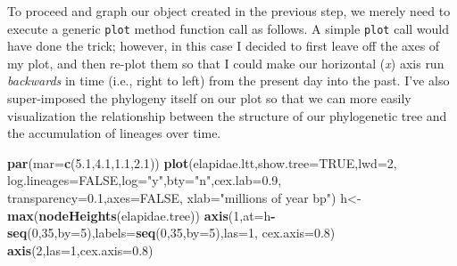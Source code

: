 \documentclass[fleqn,10pt,lineno]{wlpeerj} %
\newenvironment{Shaded}{\begin{snugshade}}{\end{snugshade}}
\newcommand{\AttributeTok}[1]{\textcolor[rgb]{0.13,0.29,0.53}{#1}}
\newcommand{\ConstantTok}[1]{\textcolor[rgb]{0.56,0.35,0.01}{#1}}
\newcommand{\DecValTok}[1]{\textcolor[rgb]{0.00,0.00,0.81}{#1}}
\newcommand{\FloatTok}[1]{\textcolor[rgb]{0.00,0.00,0.81}{#1}}
\newcommand{\FunctionTok}[1]{\textcolor[rgb]{0.13,0.29,0.53}{\textbf{#1}}}
\newcommand{\NormalTok}[1]{#1}
\newcommand{\OtherTok}[1]{\textcolor[rgb]{0.56,0.35,0.01}{#1}}
\newcommand{\SpecialCharTok}[1]{\textcolor[rgb]{0.81,0.36,0.00}{\textbf{#1}}}
\newcommand{\StringTok}[1]{\textcolor[rgb]{0.31,0.60,0.02}{#1}}
\begin{document}
To proceed and graph our object created in the previous step, we merely need to execute a generic \texttt{plot} method function call as follows. A simple \texttt{plot} call would have done the trick; however, in this case I decided to first leave off the axes of my plot, and then re-plot them so that I could make our horizontal (\emph{x}) axis run \emph{backwards} in time (i.e., right to left) from the present day into the past. I've also super-imposed the phylogeny itself on our plot so that we can more easily visualization the relationship between the structure of our phylogenetic tree and the accumulation of lineages over time.

\begin{Shaded}
\begin{Highlighting}[]
\FunctionTok{par}\NormalTok{(}\AttributeTok{mar=}\FunctionTok{c}\NormalTok{(}\FloatTok{5.1}\NormalTok{,}\FloatTok{4.1}\NormalTok{,}\FloatTok{1.1}\NormalTok{,}\FloatTok{2.1}\NormalTok{))}
\FunctionTok{plot}\NormalTok{(elapidae.ltt,}\AttributeTok{show.tree=}\ConstantTok{TRUE}\NormalTok{,}\AttributeTok{lwd=}\DecValTok{2}\NormalTok{,}
  \AttributeTok{log.lineages=}\ConstantTok{FALSE}\NormalTok{,}\AttributeTok{log=}\StringTok{"y"}\NormalTok{,}\AttributeTok{bty=}\StringTok{"n"}\NormalTok{,}\AttributeTok{cex.lab=}\FloatTok{0.9}\NormalTok{,}
  \AttributeTok{transparency=}\FloatTok{0.1}\NormalTok{,}\AttributeTok{axes=}\ConstantTok{FALSE}\NormalTok{,}
  \AttributeTok{xlab=}\StringTok{"millions of year bp"}\NormalTok{)}
\NormalTok{h}\OtherTok{\textless{}{-}}\FunctionTok{max}\NormalTok{(}\FunctionTok{nodeHeights}\NormalTok{(elapidae.tree))}
\FunctionTok{axis}\NormalTok{(}\DecValTok{1}\NormalTok{,}\AttributeTok{at=}\NormalTok{h}\SpecialCharTok{{-}}\FunctionTok{seq}\NormalTok{(}\DecValTok{0}\NormalTok{,}\DecValTok{35}\NormalTok{,}\AttributeTok{by=}\DecValTok{5}\NormalTok{),}\AttributeTok{labels=}\FunctionTok{seq}\NormalTok{(}\DecValTok{0}\NormalTok{,}\DecValTok{35}\NormalTok{,}\AttributeTok{by=}\DecValTok{5}\NormalTok{),}\AttributeTok{las=}\DecValTok{1}\NormalTok{,}
  \AttributeTok{cex.axis=}\FloatTok{0.8}\NormalTok{)}
\FunctionTok{axis}\NormalTok{(}\DecValTok{2}\NormalTok{,}\AttributeTok{las=}\DecValTok{1}\NormalTok{,}\AttributeTok{cex.axis=}\FloatTok{0.8}\NormalTok{)}
\end{Highlighting}
\end{Shaded}
\end{document}
